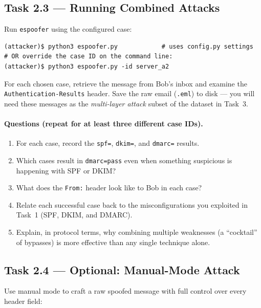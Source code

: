 \documentclass[11pt]{article}
\begin{document}
\subsection{Task 2.3 --- Running Combined Attacks}

Run \texttt{espoofer} using the configured case:

\begin{listing}[H]
\begin{verbatim}
(attacker)$ python3 espoofer.py            # uses config.py settings
# OR override the case ID on the command line:
(attacker)$ python3 espoofer.py -id server_a2
\end{verbatim}
\end{listing}

For each chosen case, retrieve the message from Bob's inbox and examine
the \texttt{Authentication-Results} header. Save the raw email
(\texttt{.eml}) to disk --- you will need these messages as the
\emph{multi-layer attack} subset of the dataset in Task~3.

\paragraph{Questions (repeat for at least three different case IDs).}
\begin{enumerate}[noitemsep]
  \item For each case, record the \texttt{spf=}, \texttt{dkim=}, and
        \texttt{dmarc=} results.
  \item Which cases result in \texttt{dmarc=pass} even when something
        suspicious is happening with SPF or DKIM?
  \item What does the \texttt{From:} header look like to Bob in each
        case?
  \item Relate each successful case back to the misconfigurations you
        exploited in Task~1 (SPF, DKIM, and DMARC).
  \item Explain, in protocol terms, why combining multiple weaknesses
        (a ``cocktail'' of bypasses) is more effective than any single
        technique alone.
\end{enumerate}

\subsection{Task 2.4 --- Optional: Manual-Mode Attack}

Use manual mode to craft a raw spoofed message with full control over
every header field:
\end{document}
